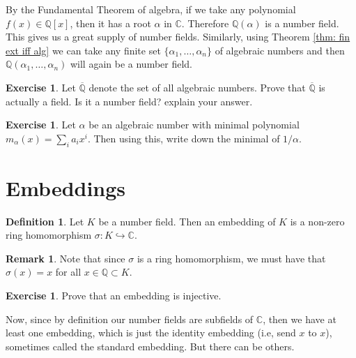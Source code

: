\documentclass[11pt,a4paper]{report}
\theoremstyle{plain}
\theoremstyle{definition}
\newtheorem{definition}[subsection]{Definition}
\theoremstyle{definition}
\newtheorem{rmrk}[subsection]{Remark}
\newtheorem{question}[subsection]{Exercise}
\def\CC{\mathbb{C}}
\def\QQ{\mathbb{Q}}
\def \a{\alpha}
\def \s {\sigma}
\def \s {\sigma}
\def \ov{\overline}
\begin{document}
	By the Fundamental Theorem of algebra, if we take any polynomial $f(x) \in \QQ[x]$, then it has a root $\a$ in $\CC$. Therefore $\QQ(\a)$ is a number field. This gives us a great supply of number fields. Similarly, using Theorem \ref{thm: fin ext iff alg} we can take any finite set $\{\a_1,\dots,\a_n\}$ of algebraic numbers and then $\QQ(\a_1,\dots,\a_n)$ will again be a number field.
	
	
	\begin{question}
		Let $\ov{\QQ}$ denote the set of all algebraic numbers.	Prove that $\ov{\QQ}$ is actually a field. Is it a number field? explain your answer.
	\end{question}
	
	\begin{question}\label{ex: min pol of inv}
		Let $\a$ be an algebraic number with minimal polynomial $m_\a(x)=\sum_i a_i x^i$. Then using this, write down the minimal of $1/\a$.
	\end{question}
	
	\section{Embeddings}
	
	\begin{definition}
		Let $K$ be a number field. Then an embedding of $K$ is a non-zero ring homomorphism $\s:K \hookrightarrow \CC$.
	\end{definition}
	
	\begin{rmrk}
		Note that since $\s$ is a ring homomorphism, we must have that $\s(x)=x$ for all $x \in \QQ \subset K$.
	\end{rmrk}
	
	\begin{question}
		Prove that an embedding is injective.
	\end{question}
	
	Now, since by definition our number fields are subfields of $\CC$, then we have at least one embedding, which  is just the identity embedding (i.e, send $x$ to $x$), sometimes called the standard embedding. But there can be others.
	
\end{document}
